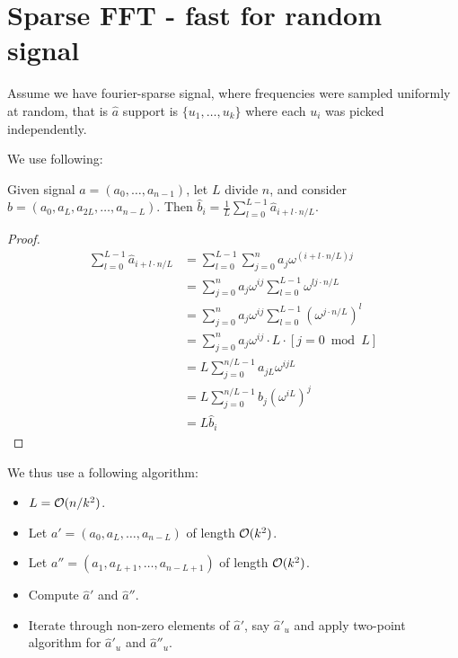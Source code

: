 \documentclass[11pt]{article}
\begin{document}


\section{Sparse FFT - fast for random signal}

Assume we have fourier-sparse signal, where frequencies were sampled uniformly at random, that is $\hat{a}$ support is $\{u_1,\ldots,u_k\}$ where each $u_i$ was picked independently.

We use following:
\begin{theorem}
Given signal $a = (a_0,\ldots,a_{n-1})$, let $L$ divide $n$, and consider $b = (a_0,a_{L},a_{2L},\ldots,a_{n-L})$. Then $\hat{b}_i = \frac{1}{L}\sum_{l = 0}^{L-1} \hat{a}_{i+l \cdot n/L}$.
\end{theorem}
\begin{proof}
\begin{align*}
 \sum_{l = 0}^{L-1} \hat{a}_{i+l \cdot n/L} &= \sum_{l = 0}^{L-1} \sum_{j=0}^{n} a_j \omega^{(i+l \cdot n/L)j}\\
 &= \sum_{j=0}^{n}  a_j \omega^{ij}  \sum_{l = 0}^{L-1} \omega^{l j \cdot n/L}\\
 &= \sum_{j=0}^{n}  a_j \omega^{ij}  \sum_{l = 0}^{L-1} (\omega^{j \cdot n/L})^l\\
 &= \sum_{j=0}^n a_j \omega^{ij} \cdot L \cdot [j = 0 \bmod L]\\
 &= L \sum_{j=0}^{n/L-1} a_{jL} \omega^{ijL} \\
 &= L \sum_{j=0}^{n/L-1} b_j (\omega^{iL})^j \\
 &= L \hat{b}_i
\end{align*}

\end{proof}

We thus use a following algorithm:

\begin{itemize}
\item $L = \mathcal{O}(n/k^2)$.
\item Let $a' = (a_0,a_{L},\ldots,a_{n-L})$ of length $\mathcal{O}(k^2)$.
\item Let $a'' = (a_1,a_{L+1},\ldots,a_{n-L+1})$  of length $\mathcal{O}(k^2)$.
\item Compute $\hat{a}'$ and $\hat{a}''$.
\item Iterate through non-zero elements of $\hat{a}'$, say $\hat{a}'_u$ and apply two-point algorithm for $\hat{a}'_u$ and $\hat{a}''_u$.
\end{itemize}
\end{document}
